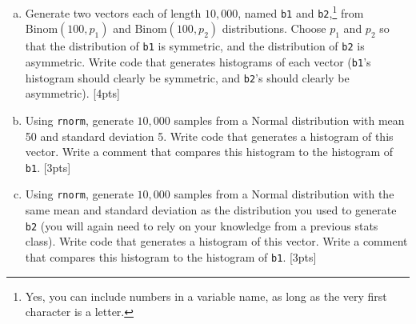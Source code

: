 \documentclass[12pt]{article}
\newcommand{\Binom}{\text{Binom}}
\begin{document}
\begin{enumerate}[(a)]
	\item Generate two vectors each of length $10,000$, named \verb|b1| and \verb|b2|,\footnote{Yes, you can include numbers in a variable name, as long as the very first character is a letter.} from $\Binom(100,p_1)$ and $\Binom(100,p_2)$ distributions. Choose $p_1$ and $p_2$ so that the distribution of \verb|b1| is symmetric, and the distribution of \verb|b2| is asymmetric. Write code that generates histograms of each vector (\verb|b1|'s histogram should clearly be symmetric, and \verb|b2|'s should clearly be asymmetric). [4pts]
	\item Using \verb|rnorm|, generate $10,000$ samples from a Normal distribution with mean 50 and standard deviation 5. Write code that generates a histogram of this vector. Write a comment that compares this histogram to the histogram of \verb|b1|. [3pts]
	\item Using \verb|rnorm|, generate $10,000$ samples from a Normal distribution with the same mean and standard deviation as the distribution you used to generate \verb|b2| (you will again need to rely on your knowledge from a previous stats class). Write code that generates a histogram of this vector. Write a comment that compares this histogram to the histogram of \verb|b1|. [3pts]
\end{enumerate}
\end{document}
